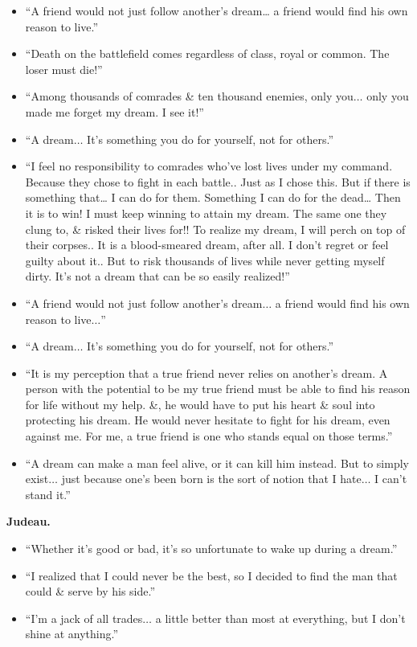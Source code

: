 \documentclass{article}
\begin{document}
\begin{enumerate}
\begin{itemize}
		\item ``A friend would not just follow another's dream… a friend would find his own reason to live.''
		\item ``Death on the battlefield comes regardless of class, royal or common. The loser must die!''
		\item ``Among thousands of comrades \& ten thousand enemies, only you$\ldots$ only you made me forget my dream. I see it!''
		\item ``A dream$\ldots$ It's something you do for yourself, not for others.''
		\item ``I feel no responsibility to comrades who've lost lives under my command. Because they chose to fight in each battle.. Just as I chose this. But if there is something that… I can do for them. Something I can do for the dead… Then it is to win! I must keep winning to attain my dream. The same one they clung to, \& risked their lives for!! To realize my dream, I will perch on top of their corpses.. It is a blood-smeared dream, after all. I don't regret or feel guilty about it.. But to risk thousands of lives while never getting myself dirty. It's not a dream that can be so easily realized!''
		\item ``A friend would not just follow another's dream$\ldots$ a friend would find his own reason to live$\ldots$''
		\item ``A dream$\ldots$ It's something you do for yourself, not for others.''
		\item ``It is my perception that a true friend never relies on another's dream. A person with the potential to be my true friend must be able to find his reason for life without my help. \&, he would have to put his heart \& soul into protecting his dream. He would never hesitate to fight for his dream, even against me. For me, a true friend is one who stands equal on those terms.''
		\item ``A dream can make a man feel alive, or it can kill him instead. But to simply exist$\ldots$ just because one's been born is the sort of notion that I hate$\ldots$ I can't stand it.''
	\end{itemize}
	{\bf Judeau.}
	\begin{itemize}
		\item ``Whether it's good or bad, it's so unfortunate to wake up during a dream.''
		\item ``I realized that I could never be the best, so I decided to find the man that could \& serve by his side.''
		\item ``I'm a jack of all trades$\ldots$ a little better than most at everything, but I don't shine at anything.''

\end{itemize}
\end{enumerate}
\end{document}
